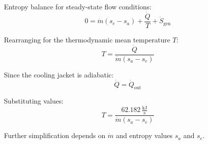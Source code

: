 Entropy balance for steady-state flow conditions:  
\[
0 = \dot{m} \left( s_e - s_a \right) + \frac{\dot{Q}}{T} + \dot{S}_{\text{gen}}
\]  

Rearranging for the thermodynamic mean temperature \( T \):  
\[
T = \frac{\dot{Q}}{\dot{m} \left( s_a - s_e \right)}
\]  

Since the cooling jacket is adiabatic:  
\[
\dot{Q} = \dot{Q}_{\text{out}}
\]  

Substituting values:  
\[
T = \frac{62.182 \, \frac{\text{kJ}}{\text{s}}}{\dot{m} \left( s_a - s_e \right)}
\]  

Further simplification depends on \( \dot{m} \) and entropy values \( s_a \) and \( s_e \).